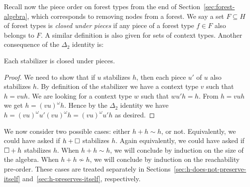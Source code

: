 \documentclass{LMCS}
\begin{document}
Recall now the piece order on forest types from the end of
Section~\ref{sec:forest-algebra}, which corresponds to removing nodes
from a forest. We say a set $F \subseteq H$ of forest types is
\emph{closed under pieces} if any piece of a forest type $f \in F$
also belongs to $F$. A similar definition is also given for sets of
context types. Another consequence of the $\Delta_2$ identity is:

\begin{lem}\label{lemma:closed-under-piece}
  Each stabilizer is closed under pieces.
\end{lem}
\begin{proof}
  We need to show that if $u$ stabilizes $h$, then each piece $u'$ of
  $u$ also stabilizes $h$. By definition of the stabilizer we have a
  context type $v$ such that $h=vuh$. We are looking for a context type $w$ such
  that $wu'h=h$. From $h=vuh$ we get $h=(vu)^\omega h$. Hence by the
  $\Delta_2$ identity we have $h=(vu)^\omega u' (vu)^\omega h =
  (vu)^\omega u' h$ as desired.
\end{proof}

We now consider two possible cases: either $h+h \sim h$, or not. Equivalently,
we could have asked if $h+\Box$ stabilizes $h$. Again equivalently, we could
have asked if $\Box+h$ stabilizes $h$. When $h+h \sim h$, we will conclude by
induction on the size of the algebra. When $h+h \not \sim h$, we will conclude
by induction on the reachability pre-order. These cases are treated separately
in Sections~\ref{sec:h-does-not-preserve-itself}
and~\ref{sec:h-preserves-itself}, respectively.
\end{document}
